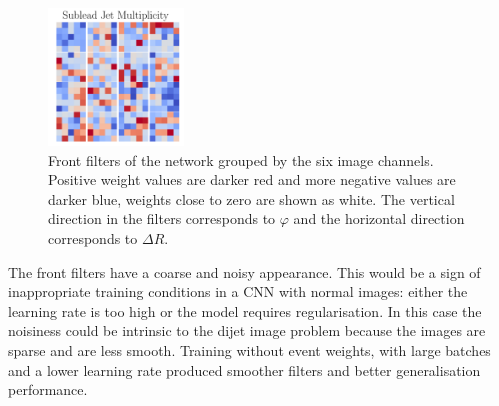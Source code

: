 \begin{figure}[h!]
\begin{center}
        \includegraphics[width=0.32\textwidth]{figures/event_selection/front_filters_channel_5.pdf}
    \end{center}
    \caption{Front filters of the network grouped by the six image channels. Positive weight values are darker red and more negative values are darker blue, weights close to zero are shown as white. The vertical direction in the filters corresponds to $\varphi$ and the horizontal direction corresponds to $\Delta{R}$.}
    \label{fig:event_categorisation:front_filters}
\end{figure}

The front filters have a coarse and noisy appearance. This would be a sign of inappropriate training conditions in a CNN with normal images: either the learning rate is too high or the model requires regularisation. 
In this case the noisiness could be intrinsic to the dijet image problem because the images are sparse and are less smooth. Training without event weights, with large batches and a lower learning rate produced smoother filters and better generalisation performance.  

